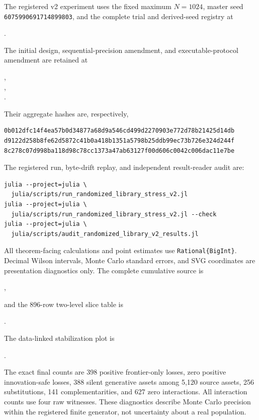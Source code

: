 The registered v2 experiment uses the fixed maximum \(N=1024\), master seed
\texttt{6075990691714899803}, and the complete trial and derived-seed registry
at
\begin{center}
.
\end{center}
The initial design, sequential-precision amendment, and executable-protocol
amendment are retained at
\begin{center}
,\\
,\\
.
\end{center}
Their aggregate hashes are, respectively,
\begin{verbatim}
0b012dfc14f4ea57b0d34877a68d9a546cd499d2270903e772d78b21425d14db
d9122d258b8fe62d5872c41b0a418b1351a5798b25ddb99ec73b726e324d244f
8c278c07d998ba118d98c78cc1373a47ab63127f00d606c0042c006dac11e7be
\end{verbatim}
The registered run, byte-drift replay, and independent result-reader audit
are:
\begin{verbatim}
julia --project=julia \
  julia/scripts/run_randomized_library_stress_v2.jl
julia --project=julia \
  julia/scripts/run_randomized_library_stress_v2.jl --check
julia --project=julia \
  julia/scripts/audit_randomized_library_v2_results.jl
\end{verbatim}

All theorem-facing calculations and point estimates use
\texttt{Rational\{BigInt\}}.  Decimal Wilson intervals, Monte Carlo standard
errors, and SVG coordinates are presentation diagnostics only.  The complete
cumulative source is
\begin{center}
,
\end{center}
and the 896-row two-level slice table is
\begin{center}
.
\end{center}
The data-linked stabilization plot is
\begin{center}
.
\end{center}
The exact final counts are 398 positive frontier-only losses, zero positive
innovation-safe losses, 388 silent generative assets among 5,120 source
assets, 256 substitutions, 141 complementarities, and 627 zero interactions.
All interaction counts use four raw witnesses.  These diagnostics describe
Monte Carlo precision within the registered finite generator, not uncertainty
about a real population.

